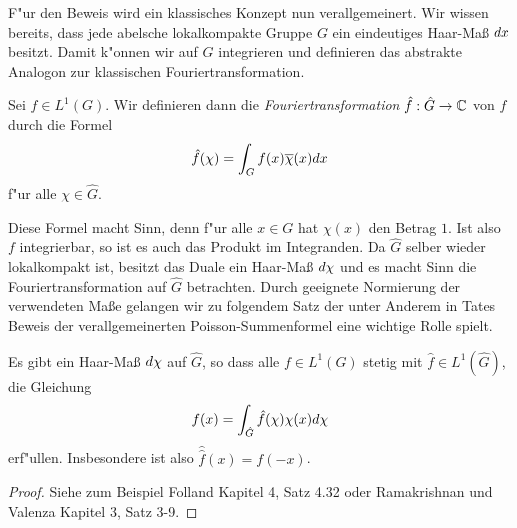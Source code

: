 	F"ur den Beweis wird ein klassisches Konzept nun verallgemeinert.
	Wir wissen bereits, dass jede abelsche lokalkompakte Gruppe $G$ ein eindeutiges Haar-Maß $\dx$ besitzt.
	Damit k"onnen wir auf $G$ integrieren und definieren das abstrakte Analogon zur klassischen Fouriertransformation.
	\begin{defi}[Fouriertransformation]
		Sei $f\in L^1(G)$. Wir definieren dann die \emph{Fouriertransformation} $\hat{f}: \hat{G} \to \Komplex$ von $f$ durch die Formel
		\begin{align*}
			\hat{f}(\chi) = \int_G f(x)\conj{\chi}(x) dx
		\end{align*}
		f"ur alle $\chi\in \hat{G}$.
	\end{defi}
	Diese Formel macht Sinn, denn f"ur alle $x \in G$ hat $\chi(x)$ den Betrag $1$. 
	Ist also $f$ integrierbar, so ist es auch das Produkt im Integranden.
	Da $\hat{G}$ selber wieder lokalkompakt ist, besitzt das Duale ein Haar-Maß $\dx[\chi]$ und es macht Sinn die Fouriertransformation auf $\hat{G}$ betrachten.
	Durch geeignete Normierung der verwendeten Maße gelangen wir zu folgendem Satz der unter Anderem in Tates Beweis der verallgemeinerten Poisson-Summenformel eine wichtige Rolle spielt.
	\begin{satz}
		Es gibt ein Haar-Maß $\dx[\chi]$ auf $\hat{G}$, so dass alle $f \in L^1(G)$ stetig mit $\hat{f} \in L^1(\hat{G})$, die Gleichung
		\begin{align*}
			f(x) = \int_{\hat{G}} \hat{f}(\chi) \chi(x) \dx[\chi]
		\end{align*}
		erf"ullen. Insbesondere ist also $\hat{\hat{f}}(x) = f(-x)$.
	\end{satz}
	\begin{proof}
		Siehe zum Beispiel Folland \cite{folland} Kapitel 4, Satz 4.32 oder Ramakrishnan und Valenza \cite{rama} Kapitel 3, Satz 3-9.
	\end{proof}

	
	
